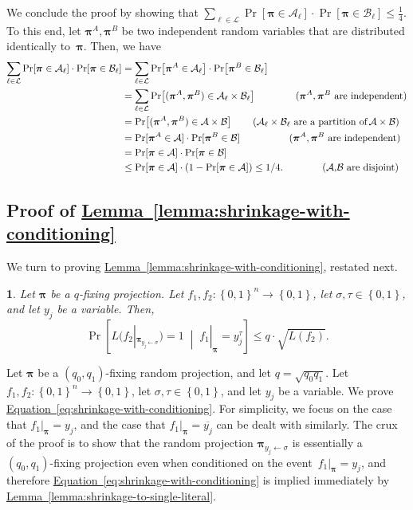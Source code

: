 \documentclass[11pt]{article}
\makeatletter
\numberwithin{equation}{section}
\theoremstyle{definition}
\theoremstyle{plain}
\newcommand{\expref}[2]{\hyperref[#2]{#1~\ref{#2}}}
\theoremstyle{definition}\newtheorem{notation}[theorem]{Notation}\theoremstyle{plain}
\newcommand{\B}{\left\{ 0,1 \right \}}
\newcommand{\cA}{\mathcal{A}}
\newcommand{\cB}{\mathcal{B}}
\newcommand{\p}{\boldsymbol{\pi}}
\newcommand{\cL}{\mathcal{L}}
\theoremstyle{definition}
\theoremstyle{plain}
\newtheorem*{restated@theorem}{\rep@title}
\newenvironment{restated}[1]{%
	 \def\rep@title{#1}%
	 \begin{restated@theorem}}%
	{\end{restated@theorem}}
\makeatother
\begin{document}
We conclude the proof by showing that $\sum_{\ell\in\cL}\Pr\!\left[\p\in\cA_{\ell}\right]\cdot\Pr\!\left[\p\in\cB_{\ell}\right]\le\frac{1}{4}$.
To this end, let $\p^{A},\p^{B}$ be two independent random variables
that are distributed identically to~$\p$. Then, we have 
\begin{align*}  %
\sum_{\ell\in\cL}\Pr\!\left[\p\in\cA_{\ell}\right]\cdot\Pr\!\left[\p\in\cB_{\ell}\right] & =\sum_{\ell\in\cL}\Pr\!\left[\p^{A}\in\cA_{\ell}\right]\cdot\Pr\!\left[\p^{B}\in\cB_{\ell}\right]\\
 & =\sum_{\ell\in\cL}\Pr\!\left[(\p^{A},\p^{B})\in\cA_{\ell}\times\cB_{\ell}\right] %
\qquad\quad\ \ \ \text{(\ensuremath{\p^{A},\p^{B}} are independent)}\\  %
& =\Pr\!\left[(\p^{A},\p^{B})\in\cA\times\cB\right]
%
\qquad   %
 \text{(\ensuremath{\cA_{\ell}\times\cB_{\ell}} are a partition of\,\ensuremath{\cA\times\cB})}\\    %
 & =\Pr[\p^{A}\in\cA]\cdot\Pr[\p^{B}\in\cB] %
\qquad\qquad\quad \text{(\ensuremath{\p^{A},\p^{B}} are independent)}\\  %
 & =\Pr[\p\in\cA]\cdot\Pr[\p\in\cB]\\
 & \le\Pr[\p\in\cA]\cdot\left(1-\Pr[\p\in\cA]\right) 
%
\le 1/4.  %
%
\qquad\qquad \text{(\ensuremath{\cA},\ensuremath{\cB} are disjoint)}\\   %
\end{align*}
%
%

\subsection{\label{subsec:shrinkage-to-two-literals}Proof of \expref{Lemma}{lemma:shrinkage-with-conditioning}}

We turn to proving \expref{Lemma}{lemma:shrinkage-with-conditioning}, 
restated next.
\begin{restated}{\expref{Lemma}{lemma:shrinkage-with-conditioning}}
Let $\p$ be a $q$-fixing projection. Let $f_{1},f_{2}\colon\B^{n}\to\B$,
let $\sigma,\tau\in\B$, and let $y_{j}$ be a variable. Then, 
\begin{equation}
\Pr\!\left[L(f_{2}|_{\p_{y_{j}\gets\sigma}})=1\;\middle|\;f_{1}|_{\p}=y_{j}^{\tau}\right]\le q\cdot\sqrt{L(f_{2})}.\label{eq:shrinkage-with-conditioning}
\end{equation}
\end{restated}

Let $\p$ be a $(q_{0},q_{1})$-fixing random projection, and let
$q=\sqrt{q_{0}q_{1}}$. Let $f_{1},f_{2}\colon\B^{n}\to\B$, let $\sigma,\tau\in\B$,
and let $y_{j}$ be a variable. We prove \expref{Equation}{eq:shrinkage-with-conditioning}.
For simplicity, we focus on the case that $f_{1}|_{\p}=y_{j}$, and
the case that $f_{1}|_{\p}=\overline{y_{j}}$ can be dealt with similarly.
The crux of the proof is to show that the random projection $\p_{y_{j}\gets\sigma}$
is essentially a $(q_{0},q_{1})$-fixing projection even when conditioned
on the event~$f_{1}|_{\p}=y_{j}$, and therefore \expref{Equation}{eq:shrinkage-with-conditioning}
is implied immediately by \expref{Lemma}{lemma:shrinkage-to-single-literal}.
\end{document}
